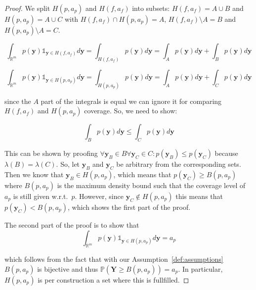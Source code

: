 \begin{proof}
    We split $H(p,a_p)$ and $H(f, a_f)$ into subsets: $H(f, a_f) = A \cup B$ and $H(p, a_p) = A \cup C$ with $H(f, a_f) \cap H(p,a_p) = A$, $H(f, a_f)\setminus A = B$ and $H(p, a_p)\setminus A = C$.

    \begin{equation}
        \int_{\mathbb{R}^{m}} p(\mathbf{y}) \mathds1_{\mathbf{y} \in H(f, a_f)} d
        \mathbf{y} = \int_{H(f, a_f)} p(\mathbf{y}) d \mathbf{y} = \int_{A}
        p(\mathbf{y})
        d \mathbf{y} + \int_{B} p(\mathbf{y}) d \mathbf{y}
    \end{equation}

    \begin{equation}
        \int_{\mathbb{R}^{m}} p(\mathbf{y}) \mathds1_{\mathbf{y} \in H(p, a_p)} d
        \mathbf{y} = \int_{H(p, a_p)} p(\mathbf{y}) d \mathbf{y} = \int_{A}
        p(\mathbf{y})
        d \mathbf{y} + \int_{C} p(\mathbf{y}) d \mathbf{y}
    \end{equation}

    since the $A$ part of the integrals is equal we can ignore it for comparing $H(f, a_f)$ and $H(p, a_p)$ coverage. So, we need to show:

    \begin{equation}
        \int_{B} p(\mathbf{y}) d \mathbf{y} \leq \int_{C} p(\mathbf{y}) d
        \mathbf{y}
    \end{equation}

    This can be shown by proofing $\forall \mathbf{y}_B\in B \forall \mathbf{y}_C \in C: p(\mathbf{y}_B) \leq p(\mathbf{y}_C)$ because $\lambda(B) =  \lambda(C)$.
    So, let $\mathbf{y}_B$ and $\mathbf{y}_C$ be arbitrary from the corresponding sets. Then we know that $\mathbf{y}_B \in H(p,a_p)$, which means that $p(\mathbf{y}_C) \geq B(p, a_p)$ where $B(p, a_p)$ is the maximum density bound such that the coverage level of $a_p$ is still given w.r.t.\ $p$. However, since $\mathbf{y}_C \notin H(p,a_p)$ this means that $p(\mathbf{y}_C) < B(p, a_p)$, which shows the first part of the proof.

    The second part of the proof is to show that
    \begin{equation}
        \int_{\mathbb{R}^{m}} p(\mathbf{y}) \mathds1_{\mathbf{y} \in H(p, a_p)} d
        \mathbf{y} = a_p
    \end{equation}

    which follows from the fact that with our Assumption~\ref{def:assumptions} $B(p, a_p)$ is bijective and thus $\mathbb{P}(\mathbf{Y} \geq B(p, a_p)) = a_p$. In particular, $H(p, a_p)$ is per construction a set where this is fullfilled.
\end{proof}

